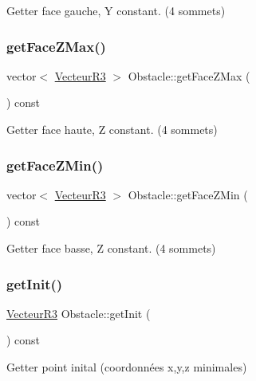 Getter face gauche, Y constant. (4 sommets) \mbox{\label{class_obstacle_a24887a162d5b7f8929c1bbae64bc70f5}} 
\subsubsection{\texorpdfstring{get\+Face\+Z\+Max()}{getFaceZMax()}}
{\footnotesize\ttfamily vector$<$ \mbox{\hyperlink{class_vecteur_r3}{Vecteur\+R3}} $>$ Obstacle\+::get\+Face\+Z\+Max (\begin{DoxyParamCaption}{ }\end{DoxyParamCaption}) const}

Getter face haute, Z constant. (4 sommets) \mbox{\label{class_obstacle_ae5d613bc2ff1f6c94e39db0855d63ade}} 
\subsubsection{\texorpdfstring{get\+Face\+Z\+Min()}{getFaceZMin()}}
{\footnotesize\ttfamily vector$<$ \mbox{\hyperlink{class_vecteur_r3}{Vecteur\+R3}} $>$ Obstacle\+::get\+Face\+Z\+Min (\begin{DoxyParamCaption}{ }\end{DoxyParamCaption}) const}

Getter face basse, Z constant. (4 sommets) \mbox{\label{class_obstacle_a3520ca88bf9ea322647b1f3382dc0916}} 
\subsubsection{\texorpdfstring{get\+Init()}{getInit()}}
{\footnotesize\ttfamily \mbox{\hyperlink{class_vecteur_r3}{Vecteur\+R3}} Obstacle\+::get\+Init (\begin{DoxyParamCaption}{ }\end{DoxyParamCaption}) const}

Getter point inital (coordonnées x,y,z minimales) \mbox{\label{class_obstacle_a4cdb40f3bee6d9a9fad25ecfc831001f}} 
